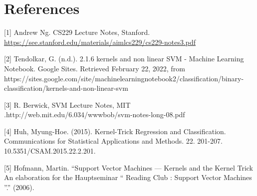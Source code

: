 \documentclass[11pt]{article}
\begin{document}
\section*{References}
[1] Andrew Ng. CS229 Lecture Notes, Stanford. \url{https://see.stanford.edu/materials/aimlcs229/cs229-notes3.pdf}

[2] Tendolkar, G. (n.d.). 2.1.6 kernels and non linear SVM - Machine Learning Notebook. Google Sites. Retrieved February 22, 2022, from https://sites.google.com/site/machinelearningnotebook2/classification/binary-classification/kernels-and-non-linear-svm 

[3] R. Berwick, SVM Lecture Notes, MIT .http://web.mit.edu/6.034/wwwbob/svm-notes-long-08.pdf

[4] Huh, Myung-Hoe. (2015). Kernel-Trick Regression and Classification. Communications for Statistical Applications and Methods. 22. 201-207. 10.5351/CSAM.2015.22.2.201. 

[5] Hofmann, Martin. “Support Vector Machines — Kernels and the Kernel Trick An elaboration for the Hauptseminar “ Reading Club : Support Vector Machines ”.” (2006).

{


}


\end{document}
